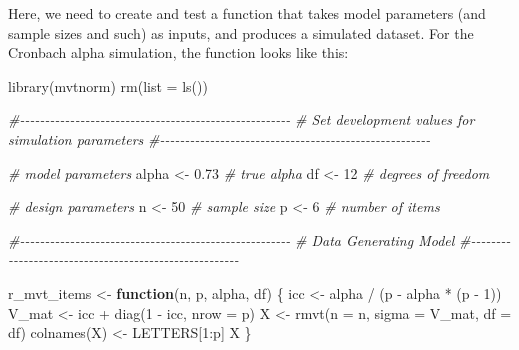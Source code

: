 \documentclass[
]{book}
\newenvironment{Shaded}{\begin{snugshade}}{\end{snugshade}}
\newcommand{\AttributeTok}[1]{\textcolor[rgb]{0.77,0.63,0.00}{#1}}
\newcommand{\CommentTok}[1]{\textcolor[rgb]{0.56,0.35,0.01}{\textit{#1}}}
\newcommand{\ControlFlowTok}[1]{\textcolor[rgb]{0.13,0.29,0.53}{\textbf{#1}}}
\newcommand{\DecValTok}[1]{\textcolor[rgb]{0.00,0.00,0.81}{#1}}
\newcommand{\FloatTok}[1]{\textcolor[rgb]{0.00,0.00,0.81}{#1}}
\newcommand{\FunctionTok}[1]{\textcolor[rgb]{0.00,0.00,0.00}{#1}}
\newcommand{\NormalTok}[1]{#1}
\newcommand{\OtherTok}[1]{\textcolor[rgb]{0.56,0.35,0.01}{#1}}
\newcommand{\SpecialCharTok}[1]{\textcolor[rgb]{0.00,0.00,0.00}{#1}}
\begin{document}
Here, we need to create and test a function that takes model parameters (and sample sizes and such) as inputs, and produces a simulated dataset. For the Cronbach alpha simulation, the function looks like this:

\begin{Shaded}
\begin{Highlighting}[]
\FunctionTok{library}\NormalTok{(mvtnorm)}
\FunctionTok{rm}\NormalTok{(}\AttributeTok{list =} \FunctionTok{ls}\NormalTok{())}

\CommentTok{\#{-}{-}{-}{-}{-}{-}{-}{-}{-}{-}{-}{-}{-}{-}{-}{-}{-}{-}{-}{-}{-}{-}{-}{-}{-}{-}{-}{-}{-}{-}{-}{-}{-}{-}{-}{-}{-}{-}{-}{-}{-}{-}{-}{-}{-}{-}{-}{-}{-}{-}{-}{-}{-}{-}}
\CommentTok{\# Set development values for simulation parameters}
\CommentTok{\#{-}{-}{-}{-}{-}{-}{-}{-}{-}{-}{-}{-}{-}{-}{-}{-}{-}{-}{-}{-}{-}{-}{-}{-}{-}{-}{-}{-}{-}{-}{-}{-}{-}{-}{-}{-}{-}{-}{-}{-}{-}{-}{-}{-}{-}{-}{-}{-}{-}{-}{-}{-}{-}{-}}

\CommentTok{\# model parameters}
\NormalTok{alpha }\OtherTok{\textless{}{-}} \FloatTok{0.73} \CommentTok{\# true alpha}
\NormalTok{df }\OtherTok{\textless{}{-}} \DecValTok{12} \CommentTok{\# degrees of freedom}

\CommentTok{\# design parameters}
\NormalTok{n }\OtherTok{\textless{}{-}} \DecValTok{50} \CommentTok{\# sample size}
\NormalTok{p }\OtherTok{\textless{}{-}} \DecValTok{6} \CommentTok{\# number of items}

\CommentTok{\#{-}{-}{-}{-}{-}{-}{-}{-}{-}{-}{-}{-}{-}{-}{-}{-}{-}{-}{-}{-}{-}{-}{-}{-}{-}{-}{-}{-}{-}{-}{-}{-}{-}{-}{-}{-}{-}{-}{-}{-}{-}{-}{-}{-}{-}{-}{-}{-}{-}{-}{-}{-}{-}{-}}
\CommentTok{\# Data Generating Model}
\CommentTok{\#{-}{-}{-}{-}{-}{-}{-}{-}{-}{-}{-}{-}{-}{-}{-}{-}{-}{-}{-}{-}{-}{-}{-}{-}{-}{-}{-}{-}{-}{-}{-}{-}{-}{-}{-}{-}{-}{-}{-}{-}{-}{-}{-}{-}{-}{-}{-}{-}{-}{-}{-}{-}{-}{-}}

\NormalTok{r\_mvt\_items }\OtherTok{\textless{}{-}} \ControlFlowTok{function}\NormalTok{(n, p, alpha, df) \{}
\NormalTok{  icc }\OtherTok{\textless{}{-}}\NormalTok{ alpha }\SpecialCharTok{/}\NormalTok{ (p }\SpecialCharTok{{-}}\NormalTok{ alpha }\SpecialCharTok{*}\NormalTok{ (p }\SpecialCharTok{{-}} \DecValTok{1}\NormalTok{))}
\NormalTok{  V\_mat }\OtherTok{\textless{}{-}}\NormalTok{ icc }\SpecialCharTok{+} \FunctionTok{diag}\NormalTok{(}\DecValTok{1} \SpecialCharTok{{-}}\NormalTok{ icc, }\AttributeTok{nrow =}\NormalTok{ p)}
\NormalTok{  X }\OtherTok{\textless{}{-}} \FunctionTok{rmvt}\NormalTok{(}\AttributeTok{n =}\NormalTok{ n, }\AttributeTok{sigma =}\NormalTok{ V\_mat, }\AttributeTok{df =}\NormalTok{ df)}
  \FunctionTok{colnames}\NormalTok{(X) }\OtherTok{\textless{}{-}}\NormalTok{ LETTERS[}\DecValTok{1}\SpecialCharTok{:}\NormalTok{p]}
\NormalTok{  X}
\NormalTok{\}}


\end{Highlighting}
\end{Shaded}
\end{document}
